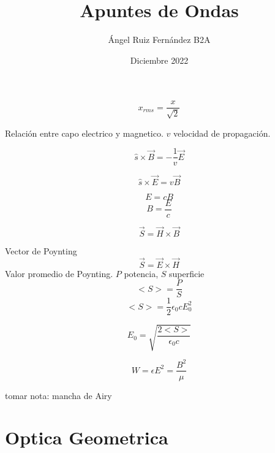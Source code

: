 \documentclass[12pt, letterpaper, twoside]{article}
\title{Apuntes de Ondas}
\author{Ángel Ruiz Fernández B2A}
\date{Diciembre 2022}
\begin{document}
	\maketitle
	
	\begin{equation}
		x_{rms} = \frac{x}{\sqrt{2}}
	\end{equation}
	
	Relación entre capo electrico y magnetico. $v$ velocidad de propagación. 
	
	\begin{equation}
		\hat{s} \times \vec{B} = - \frac{1}{v} \vec{E}
	\end{equation}

	\begin{equation}
		\hat{s} \times \vec{E} = v \vec{B}
	\end{equation}

	\begin{equation}
		E = cB
	\end{equation}
	\begin{equation}
		B = \frac{E}{c}
	\end{equation}

	\begin{equation}
		\vec{S} = \vec{H} \times \vec{B}
	\end{equation}

	Vector de Poynting
	\begin{equation}
		\vec{S} = \vec{E} \times \vec{H}
	\end{equation}
	Valor promedio de Poynting. $P$ potencia, $S$ superficie
	\begin{equation}
		<S> = \frac{P}{S}
	\end{equation}
	\begin{equation}
		<S> = \frac{1}{2} \epsilon_0 c E^2_0
	\end{equation}

	\begin{equation}
		E_0 = \sqrt{\frac{2<S>}{\epsilon_0 c}}
	\end{equation}

	\begin{equation}
		W = \epsilon E^2  = \frac{B^2}{\mu}
	\end{equation}

	tomar nota: mancha de Airy
	
	\section{Optica Geometrica}
	
\end{document}
